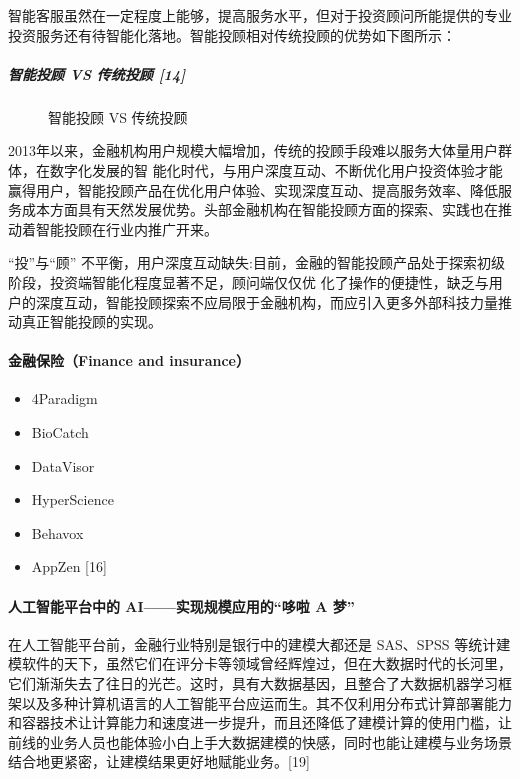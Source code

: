 \documentclass[letterpaper,10pt,english]{sphinxmanual}
\begin{document}
智能客服虽然在一定程度上能够，提高服务水平，但对于投资顾问所能提供的专业投资服务还有待智能化落地。智能投顾相对传统投顾的优势如下图所示：


\subparagraph{智能投顾 VS 传统投顾 {[}14{]}}
\label{\detokenize{chapter_project/AI_Finance:vs-14}}
\begin{figure}[H]
\centering
\capstart

\noindent{}
\caption{智能投顾 VS 传统投顾}\label{\detokenize{chapter_project/AI_Finance:id38}}\end{figure}

2013年以来，金融机构用户规模大幅增加，传统的投顾手段难以服务大体量用户群体，在数字化发展的智
能化时代，与用户深度互动、不断优化用户投资体验才能赢得用户，智能投顾产品在优化用户体验、实现深度互动、提高服务效率、降低服务成本方面具有天然发展优势。头部金融机构在智能投顾方面的探索、实践也在推动着智能投顾在行业内推广开来。

“投”与“顾”
不平衡，用户深度互动缺失:目前，金融的智能投顾产品处于探索初级阶段，投资端智能化程度显著不足，顾问端仅仅优
化了操作的便捷性，缺乏与用户的深度互动，智能投顾探索不应局限于金融机构，而应引入更多外部科技力量推动真正智能投顾的实现。


\paragraph{金融保险（Finance and insurance）}
\label{\detokenize{chapter_project/AI_Finance:finance-and-insurance}}\begin{itemize}
\item {} 
4Paradigm

\item {} 
BioCatch

\item {} 
DataVisor

\item {} 
HyperScience

\item {} 
Behavox

\item {} 
AppZen {[}16{]}

\end{itemize}


\paragraph{人工智能平台中的 AI——实现规模应用的“哆啦 A 梦”}
\label{\detokenize{chapter_project/AI_Finance:ai-a}}
在人工智能平台前，金融行业特别是银行中的建模大都还是 SAS、SPSS
等统计建模软件的天下，虽然它们在评分卡等领域曾经辉煌过，但在大数据时代的长河里，它们渐渐失去了往日的光芒。这时，具有大数据基因，且整合了大数据机器学习框架以及多种计算机语言的人工智能平台应运而生。其不仅利用分布式计算部署能力和容器技术让计算能力和速度进一步提升，而且还降低了建模计算的使用门槛，让前线的业务人员也能体验小白上手大数据建模的快感，同时也能让建模与业务场景结合地更紧密，让建模结果更好地赋能业务。{[}19{]}
\end{document}
